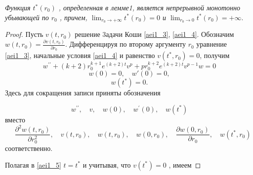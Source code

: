 \begin{lemma}\label{aeiR_2}
\textit{ Функция $ t^*(r_0) $ , определенная в лемме1,
является непрерывной монотонно убывающей по $ r_0 $ , причем, $
\displaystyle \lim_{r_0 \to +\infty}t^{*}(r_0)=0 $  и $
\displaystyle \lim_{r_0 \to 0}t^{*}(r_0)=+\infty.$}
\end{lemma}
\begin{proof}
Пусть $ v(t,r_0) $ решение 3адачи Коши \eqref{aei1_3},
\eqref{aei1_4}. Обозначим $ w(t,r_0)=\frac {\partial v(t,r_0)}{\partial r_0} $. 
Дифференцируя по второму аргументу $ r_0 $ уравнение \eqref{aei1_3},
начальные условия \eqref{aei1_4} и равенство $ v(t^*,r_0)=0 $, получим
\begin{equation}\label{aei1_8}
w^{\prime\prime}+(k+2)r_0^{k+1}e^{(k+2)t}v^p+pr_0^{k+2}e^{(k+2)t}v^{p-1}w=0
\end{equation}
\begin{equation}\label{aei1_9}
w(0)=0, \quad w{ \prime}(0)=0,
\end{equation}
\begin{equation}\label{aei1_10}
w(t^*)=0.
\end{equation}
Здесь  для сокращения записи приняты обозначения

$$
w^{\prime\prime},\quad v,\quad w(0),\quad w^{\prime}(0),\quad w(t^*)
$$
 вместо
 $$ \quad \frac {\partial^2w(t,r_0)}{\partial r_0^2},
\quad v(t,r_0),\quad w(t,r_0),\quad w(0,r_0),\quad \frac {\partial
w(0,r_0)}{\partial r_0},\quad w(t^*,r_0)
$$
соответственно.

Полагая в \eqref{aei1_5} $ t=t^* $  и учитывая, что $ v(t^*)=0 $ , имеем


\end{proof}
